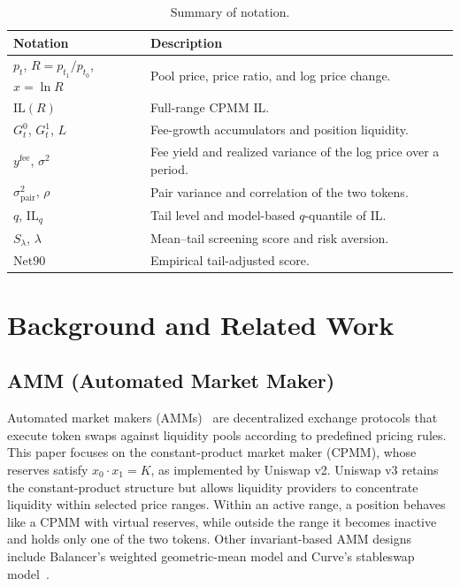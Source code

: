 \documentclass[10pt,conference,compsocconf]{IEEEtran}
\begin{document}
\begin{table}[t]
\centering
\caption{Summary of notation.}
\label{tab:notation}
\scriptsize
\begingroup
\setlength{\tabcolsep}{3pt}
\renewcommand{\arraystretch}{0.92}
\begin{tabular}{@{}p{}p{}@{}}
\toprule
Notation & Description \\
\midrule
$p_t$, $R=p_{t_1}/p_{t_0}$, $x=\ln R$
& Pool price, price ratio, and log price change. \\

$\mathrm{IL}(R)$
& Full-range CPMM IL. \\

$G^{0}_t$, $G^{1}_t$, $L$
& Fee-growth accumulators and position liquidity. \\

$y^{\mathrm{fee}}$, $\sigma^2$
& Fee yield and realized variance of the log price over a period. \\

$\sigma^2_{\text{pair}}$, $\rho$
& Pair variance and correlation of the two tokens. \\

$q$, $\mathrm{IL}_q$
& Tail level and model-based $q$-quantile of IL. \\

$S_\lambda$, $\lambda$
& Mean--tail screening score and risk aversion. \\

$\mathrm{Net90}$
& Empirical tail-adjusted score. \\

\bottomrule
\end{tabular}
\endgroup
\end{table}

\section{Background and Related Work}
\label{sec:background}

\subsection{AMM (Automated Market Maker)}
Automated market makers (AMMs)~\cite{hertzog2017bancor} are decentralized exchange protocols that execute token swaps against liquidity pools according to predefined pricing rules. This paper focuses on the constant-product market maker (CPMM), whose reserves satisfy $x_0\cdot x_1=K$, as implemented by Uniswap v2. Uniswap v3 retains the constant-product structure but allows liquidity providers to concentrate liquidity within selected price ranges. Within an active range, a position behaves like a CPMM with virtual reserves, while outside the range it becomes inactive and holds only one of the two tokens. Other invariant-based AMM designs include Balancer's weighted geometric-mean model and Curve's stableswap model~\cite{bartoletti2022theory}.
\end{document}
